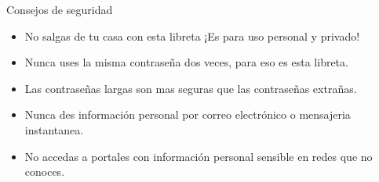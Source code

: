 \documentclass{article}
\newcommand{\cmark}{\ding{51}}%
\newcommand{\xmark}{\ding{55}}%
\begin{document}
\linespread{1.6}

\selectfont


\color{gris}



\begin{center}
	\begin{minipage}{0.48\textwidth}
		{\LARGE Consejos de seguridad}
		\begin{itemize}
			\item[\xmark] No salgas de tu casa con esta libreta ¡Es para uso personal y privado!
			\item[\xmark] Nunca uses la misma contraseña dos veces, para eso es esta libreta.
			\item[\cmark] Las contraseñas largas son mas seguras que las contraseñas extrañas.
			\item[\xmark] Nunca des información personal por correo electrónico o mensajeria instantanea.
			\item[\xmark] No accedas a portales con información personal sensible en redes que no conoces.
		\end{itemize}
	\end{minipage} \hspace{0.5cm}
	\begin{minipage}{0.48\textwidth}
		\hspace{3cm}
	\end{minipage}
\end{center}
\end{document}
